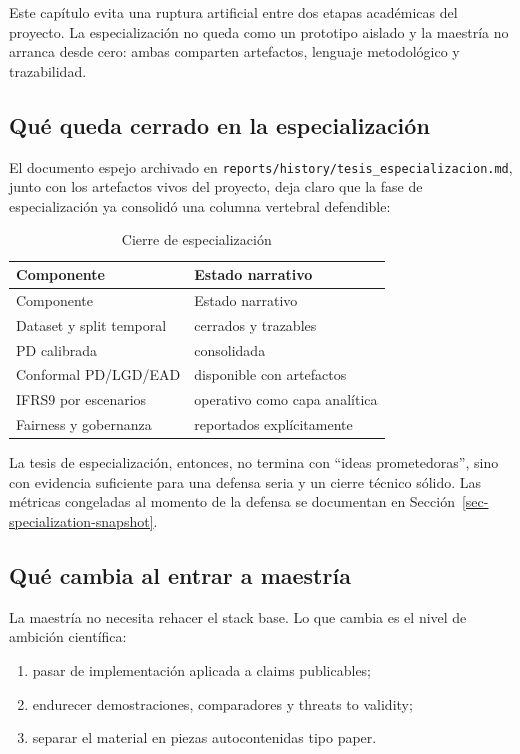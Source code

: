 \documentclass[
  spanish,
  11pt,
  letterpaper,
]{scrbook}
\providecommand{\tightlist}{%
  \setlength{\itemsep}{0pt}\setlength{\parskip}{0pt}}
\theoremstyle{plain}
\theoremstyle{remark}
\begin{document}
Este capítulo evita una ruptura artificial entre dos etapas académicas
del proyecto. La especialización no queda como un prototipo aislado y la
maestría no arranca desde cero: ambas comparten artefactos, lenguaje
metodológico y trazabilidad.

\subsection{Qué queda cerrado en la
especialización}\label{quuxe9-queda-cerrado-en-la-especializaciuxf3n}

El documento espejo archivado en
\texttt{reports/history/tesis\_especializacion.md}, junto con los
artefactos vivos del proyecto, deja claro que la fase de especialización
ya consolidó una columna vertebral defendible:

\begin{longtable}[]{@{}ll@{}}
\caption{Cierre de
especialización}\label{tbl-bridge-specialization}\tabularnewline
\toprule\noalign{}
Componente & Estado narrativo \\
\midrule\noalign{}
\endfirsthead
\toprule\noalign{}
Componente & Estado narrativo \\
\midrule\noalign{}
\endhead
\bottomrule\noalign{}
\endlastfoot
Dataset y split temporal & cerrados y trazables \\
PD calibrada & consolidada \\
Conformal PD/LGD/EAD & disponible con artefactos \\
IFRS9 por escenarios & operativo como capa analítica \\
Fairness y gobernanza & reportados explícitamente \\
\end{longtable}

La tesis de especialización, entonces, no termina con ``ideas
prometedoras'', sino con evidencia suficiente para una defensa seria y
un cierre técnico sólido. Las métricas congeladas al momento de la
defensa se documentan en Sección~\ref{sec-specialization-snapshot}.

\subsection{Qué cambia al entrar a
maestría}\label{quuxe9-cambia-al-entrar-a-maestruxeda}

La maestría no necesita rehacer el stack base. Lo que cambia es el nivel
de ambición científica:

\begin{enumerate}
\def\labelenumi{\arabic{enumi}.}
\tightlist
\item
  pasar de implementación aplicada a claims publicables;
\item
  endurecer demostraciones, comparadores y threats to validity;
\item
  separar el material en piezas autocontenidas tipo paper.
\end{enumerate}
\end{document}
